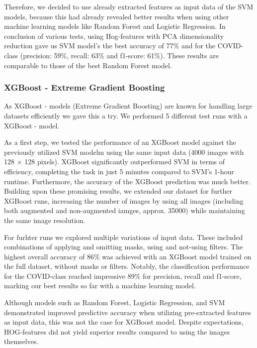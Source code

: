 \documentclass{article}
\begin{document}
Therefore, we decided to use already extracted features as input data of the SVM models, because this had already revealed better results when using other machine learning models like Random Forest and Logistic Regression. In conclusion of various tests, using Hog-features with PCA dimensionality reduction gave us SVM model's the best accuracy of 77\% and for the COVID-class (precision: 59\%, recall: 63\% and f1-score: 61\%). These results are comparable to those of the best Random Forest model.


\subsubsection{XGBoost - Extreme Gradient Boosting}
As XGBoost - models (Extreme Gradient Boosting) are known for handling large datasets efficiently we gave this a try. We performed 5 different test runs with a XGBoost - model. 

As a first step, we tested the performance of an XGBoost model against the previously utilized SVM modelm using the same input data (4000 images with 128 × 128 pixels). XGBoost significantly outperformed SVM in terms of efficiency, completing the task in just 5 minutes compared to SVM’s 1-hour runtime. Furthermore, the accuracy of the XGBoost prediction was much better. 
Building upon these promising results, we extended our dataset for further XGBoost runs, increasing the number of images by using all images (including both augmented and non-augmented iamges, approx. 35000) while maintaining the same image resolution.

For furhter runs we explored multiple variations of input data. These included combinations of applying and omitting masks, using and not-using filters. The highest overall accuracy of 86\% was achieved with an XGBoost model trained on the full dataset, without masks or filters. Notably, the classification performance for the COVID-class reached impressive 89\% for precision, recall and f1-score, marking our best results so far with a machine learning model.

Although models such as Random Forest, Logistic Regression, and SVM demonstrated improved predictive accuracy when utilizing pre-extracted features as input data, this was not the case for XGBoost model. Despite expectations, HOG-features did not yield superior results compared to using the images themselves.
\end{document}
